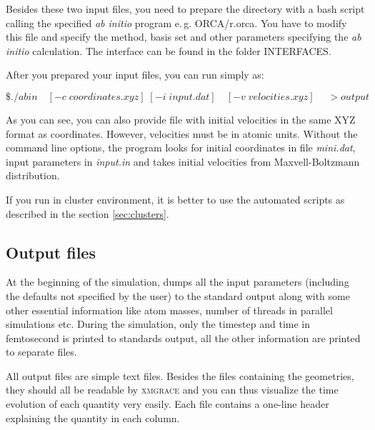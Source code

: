 Besides these two input files, you need to prepare the directory with a bash script calling the specified \textit{ab initio} program e.\,g. ORCA/r.orca. You have to modify this file and specify the method, basis set and other parameters specifying the \textit{ab initio} calculation. The interface can be found in the folder INTERFACES.

After you prepared your input files, you can run \abin simply as:

\bigskip
\noindent \colorbox{black!20}{$ \$ ./abin \quad [-c \; coordinates.xyz]\; [-i\; input.dat]\quad [-v \; velocities.xyz]\; \quad > output $}

\bigskip \noindent
As you can see, you can also provide file with initial velocities in the same XYZ format as coordinates. However, velocities must be in atomic units. Without the command line options, the program looks for initial coordinates in file \textit{mini.dat}, input parameters in \textit{input.in} and takes initial velocities from Maxvell-Boltzmann distribution.

If you run \abin in cluster environment, it is better to use the automated scripts as described in the section \ref{sec:clusters}.

\subsection{Output files}

At the beginning of the simulation, \abin dumps all the input parameters (including the defaults not specified by the user)
to the standard output along with some other essential information like atom masses, number of threads in parallel simulations etc.
During the simulation, only the timestep and time in femtosecond is printed to standards output, all the other information are printed to separate files.

All output files are simple text files. Besides the files containing the geometries, they should all be readable by \textsc{xmgrace} and you can thus visualize the time evolution of each quantity very easily. Each file contains a one-line header explaining the quantity in each column.

